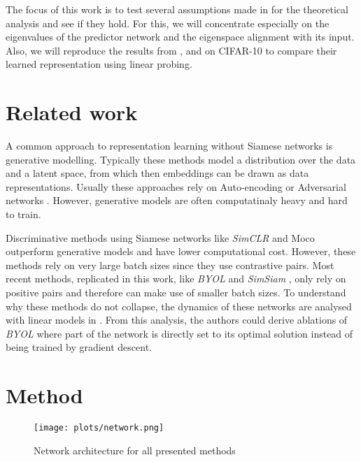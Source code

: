 The focus of this work is to test several assumptions made in \cite{tian2021understanding} for the theoretical analysis and see if they hold. For this, we will concentrate especially on the eigenvalues of the predictor network and the eigenspace alignment with its input. Also, we will reproduce the results from \cite{tian2021understanding}, \cite{grill2020bootstrap} and \cite{chen2020exploring} on CIFAR-10 to compare their learned representation using linear probing. 

\section{Related work}
\label{sec:rel_work}
A common approach to representation learning without Siamese networks is generative modelling. Typically these methods model a distribution over the data and a latent space, from which then embeddings can be drawn as data representations. Usually these approaches rely on Auto-encoding \cite{kingma2014autoencoding, vincent2008denoising} or Adversarial networks \cite{donahue2017adversarial, donahue2019large}. However, generative models are often computatinaly heavy and hard to train.

Discriminative methods using Siamese networks like \emph{\emph{SimCLR}} \cite{chen2020simple, chen2020big} and Moco \cite{he2020momentum} outperform generative models and have lower computational cost. However, these methods rely on very large batch sizes since they use contrastive pairs. Most recent methods, replicated in this work, like \emph{BYOL} \cite{grill2020bootstrap} and \emph{SimSiam} \cite{chen2020exploring}, only rely on positive pairs and therefore can make use of smaller batch sizes. To understand why these methods do not collapse, the dynamics of these networks are analysed with linear models in \cite{tian2021understanding, wang2021demystifying}. From this analysis, the authors could derive ablations of \emph{BYOL} where part of the network is directly set to its optimal solution instead of being trained by gradient descent. 

\section{Method}
\begin{figure}[h]
    \centering
    \texttt{[image: plots/network.png]}
    \caption{Network architecture for all presented methods}
    \label{fig:network}
\end{figure}

